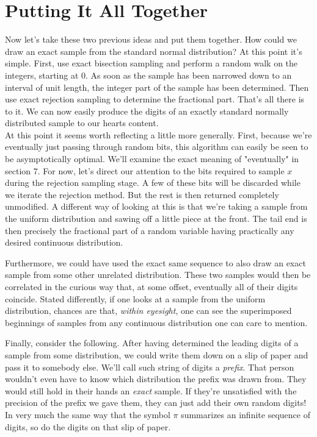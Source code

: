 \section{Putting It All Together}

Now let's take these two previous ideas and put them together. How could we draw an exact sample from the standard normal distribution? At this point it's simple. First, use exact bisection sampling and perform a random walk on the integers, starting at 0. As soon as the sample has been narrowed down to an interval of unit length, the integer part of the sample has been determined. Then use exact rejection sampling to determine the fractional part. That's all there is to it. We can now easily produce the digits of an exactly standard normally distributed sample to our hearts content.\\

At this point it seems worth reflecting a little more generally. First, because we're eventually just passing through random bits, this algorithm can easily be seen to be asymptotically optimal. We'll examine the exact meaning of "eventually" in section 7. For now, let's direct our attention to the bits required to sample $x$ during the rejection sampling stage. A few of these bits will be discarded while we iterate the rejection method. But the rest is then returned completely unmodified. A different way of looking at this is that we're taking a sample from the uniform distribution and sawing off a little piece at the front. The tail end is then precisely the fractional part of a random variable having practically any desired continuous distribution.

Furthermore, we could have used the exact same sequence to also draw an exact sample from some other unrelated distribution. These two samples would then be correlated in the curious way that, at some offset, eventually all of their digits coincide. Stated differently, if one looks at a sample from the uniform distribution, chances are that, \textit{within eyesight}, one can see the superimposed beginnings of samples from any continuous distribution one can care to mention.

Finally, consider the following. After having determined the leading digits of a sample from some distribution, we could write them down on a slip of paper and pass it to somebody else. We'll call such string of digits a \textit{prefix}. That person wouldn't even have to know which distribution the prefix was drawn from. They would still hold in their hands an \textit{exact} sample. If they're unsatisfied with the precision of the prefix we gave them, they can just add their own random digits! In very much the same way that the symbol $\pi$ summarizes an infinite sequence of digits, so do the digits on that slip of paper.

